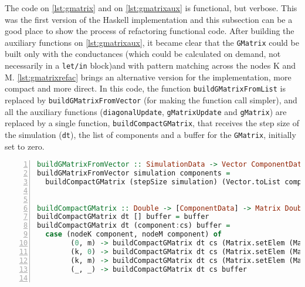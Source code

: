 The code on \cref{lst:gmatrix} and on \cref{lst:gmatrixaux} is functional, but verbose. This was the first version of the Haskell implementation and this subsection can be a good place to show the process of refactoring functional code. After building the auxiliary functions on \cref{lst:gmatrixaux}, it became clear that the \lstinline!GMatrix! could be built only with the conductances (which could be calculated on demand, not necessarily in a \lstinline!let/in! block)and with pattern matching across the nodes K and M. \cref{lst:gmatrixrefac} brings an alternative version for the implementation, more compact and more direct. In this code, the function \lstinline!buildGMatrixFromList! is replaced by \lstinline!buildGMatrixFromVector! (for making the function call simpler), and all the auxiliary functions (\lstinline!diagonalUpdate!, \lstinline!gMatrixUpdate! and \lstinline!gMatrix!) are replaced by a single function, \lstinline!buildCompactGMatrix!, that receives the step size of the simulation (\lstinline!dt!), the list of components and a buffer for the \lstinline!GMatrix!, initially set to zero.

\begin{lstlisting}[language=Haskell, numbers=left, caption={Building the G Matrix buffer update}, captionpos=b, label={lst:gmatrixrefac}]
buildGMatrixFromVector :: SimulationData -> Vector ComponentData -> Matrix Double
buildGMatrixFromVector simulation components =
  buildCompactGMatrix (stepSize simulation) (Vector.toList components) (Matrix.zero (nodes simulation) (nodes simulation))


buildCompactGMatrix :: Double -> [ComponentData] -> Matrix Double -> Matrix Double
buildCompactGMatrix dt [] buffer = buffer
buildCompactGMatrix dt (component:cs) buffer =
  case (nodeK component, nodeM component) of 
        (0, m) -> buildCompactGMatrix dt cs (Matrix.setElem (Matrix.getElem m m buffer + condutance component dt) (m, m) buffer)
        (k, 0) -> buildCompactGMatrix dt cs (Matrix.setElem (Matrix.getElem k k buffer + condutance component dt) (k, k) buffer)
        (k, m) -> buildCompactGMatrix dt cs (Matrix.setElem (Matrix.getElem k k buffer + condutance component dt) (k, k) (Matrix.setElem (Matrix.getElem m m buffer + condutance component dt) (m, m) (Matrix.setElem (Matrix.getElem k m buffer - condutance component dt) (k, m) (Matrix.setElem (Matrix.getElem m k buffer - condutance component dt) (m, k) buffer))))
        (_, _) -> buildCompactGMatrix dt cs buffer


\end{lstlisting}

